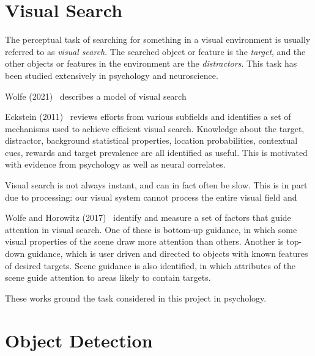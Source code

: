 
\section{Visual Search}
\label{sec:visualsearch}

The perceptual task of searching for something in a visual environment is usually referred to as \textit{visual search}.
The searched object or feature is the \textit{target}, and the other objects or features in the environment are the \textit{distractors}.
This task has been studied extensively in psychology and neuroscience.

Wolfe (2021)~\cite{wolfe_guided_2021} describes a model of visual search


Eckstein (2011)~\cite{eckstein_visual_2011} reviews efforts from various subfields and identifies a set of mechanisms used to achieve efficient visual search.
Knowledge about the target, distractor, background statistical properties, location probabilities, contextual cues, rewards and target prevalence are all identified as useful.
This is motivated with evidence from psychology as well as neural correlates.

Visual search is not always instant, and can in fact often be slow.
This is in part due to processing: our visual system cannot process the entire visual field and 


Wolfe and Horowitz (2017)~\cite{wolfe_horowitz_2017} identify and measure a set of factors that guide attention in visual search.
One of these is bottom-up guidance, in which some visual properties of the scene draw more attention than others.
Another is top-down guidance, which is user driven and directed to objects with known features of desired targets.
Scene guidance is also identified, in which attributes of the scene guide attention to areas likely to contain targets. 

These works ground the task considered in this project in psychology.


\section{Object Detection}

